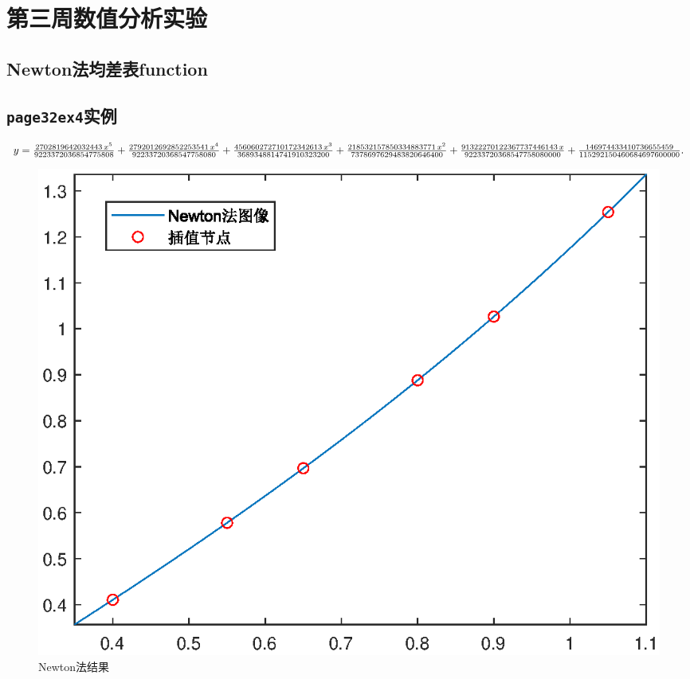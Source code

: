 \section{第三周数值分析实验}
\subsection{Newton法均差表function}

\subsection{\texttt{page32ex4}实例}

\qa $y=\frac{2702819642032443\,x^5}{9223372036854775808}+\frac{2792012692852253541\,x^4}{92233720368547758080}+\frac{456060272710172342613\,x^3}{3689348814741910323200}\\+\frac{218532157850334883771\,x^2}{7378697629483820646400}+\frac{91322270122367737446143\,x}{92233720368547758080000}+\frac{146974433410736655459}{115292150460684697600000}.$
\begin{figure}[H]
	\centering
	\includegraphics[width = 0.6\linewidth]{day3/newton.eps}
	\caption{Newton法结果}
\end{figure}

